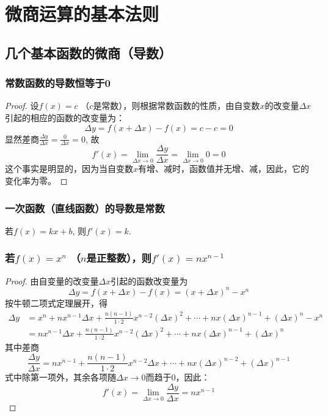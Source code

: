 \section{微商运算的基本法则}
\subsection{几个基本函数的微商（导数）}
\subsubsection{常数函数的导数恒等于0}

\begin{proof}
设$f(x)=c$ （$c$是常数），则根据常数函数的性质，由自变数$x$的改变量$\Delta x$引起的相应的函数的改变量为：
\[\Delta y=f (x+\Delta x) -f (x)=c-c=0\]
显然差商$\frac{\Delta y}{\Delta x}=\frac{0}{\Delta x}=0$, 故
\[f' (x) =\lim_{\Delta x\to 0}\frac{\Delta y}{\Delta x}=
\lim_{\Delta x\to 0} 0=0\]
这个事实是明显的，因为当自变数$x$有增、减时，函数值并无增、减，因此，它的变化率为零。
\end{proof}

\subsubsection{一次函数（直线函数）的导数是常数}

若$f(x)=kx+b$, 则$f'(x)=k$. 

\subsubsection{若$f(x)=x^n$ （$n$是正整数），则$f'(x)=nx^{n-1}$}

\begin{proof}
  由自变量的改变量$\Delta x$引起的函数改变量为
\[\Delta y=f (x+\Delta x) -f (x) = (x+\Delta x)^n-x^n\] 
按牛顿二项式定理展开，得  
\[\begin{split}
\Delta y&= x^n+nx^{n-1}\Delta x+\frac{n(n-1)}{1\cdot 2}x^{n-2}(\Delta x)^2+\cdots+nx(\Delta x)^{n-1}+(\Delta x)^n-x^n\\
&=nx^{n-1}\Delta x+\frac{n(n-1)}{1\cdot 2}x^{n-2}(\Delta x)^2+\cdots+nx(\Delta x)^{n-1}+(\Delta x)^n
\end{split}\]
其中差商
\[\frac{\Delta y}{\Delta x}=nx^{n-1}+\frac{n(n-1)}{1\cdot 2}x^{n-2}\Delta x+\cdots+nx(\Delta x)^{n-2}+(\Delta x)^{n-1}\]
式中除第一项外，其余各项随$\Delta x\to 0$而趋于0，因此：
\[f'(x)=\lim_{\Delta x\to 0}\frac{\Delta y}{\Delta x}=nx^{n-1}\]
\end{proof}

